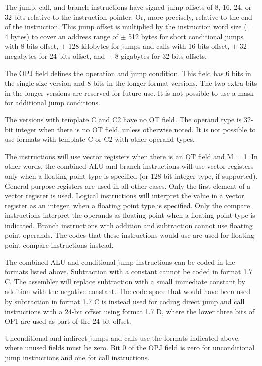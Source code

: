 \documentclass[forwardcom.tex]{subfiles}
\begin{document}
The jump, call, and branch instructions have signed jump offsets of 8, 16, 24, or 32 bits relative to the instruction pointer. Or, more precisely, relative to the end of the instruction. This jump offset is multiplied by the instruction word size (= 4 bytes) to cover an address range of $\pm$ 512 bytes for short conditional jumps with 8 bits offset, $\pm$ 128 kilobytes for jumps and calls with 16 bits offset, $\pm$ 32 megabytes for 24 bits offset, and $\pm$ 8 gigabytes for 32 bits offsets.
\vv

The OPJ field defines the operation and jump condition. This field has 6 bits in the single size version and 8 bits in the longer format versions. The two extra bits in the longer versions are reserved for future use. It is not possible to use a mask for additional jump conditions.
\vv

The versions with template C and C2 have no OT field. The operand type is 32-bit integer when there is no OT field, unless otherwise noted. It is not possible to use formats with template C or C2 with other operand types. 
\vv

The instructions will use vector registers when there is an OT field and M = 1. In other words, the combined ALU-and-branch instructions will use vector registers only when a floating point type is specified (or 128-bit integer type, if supported). General purpose registers are used in all other cases. Only the first element of a vector register is used. 
Logical instructions will interpret the value in a vector register as an integer, when a floating point type is specified. Only the compare instructions interpret the operands as floating point when a floating point type is indicated. Branch instructions with addition and subtraction cannot use floating point operands. The codes that these instructions would use are used for floating point compare instructions instead.
\vv

The combined ALU and conditional jump instructions can be coded in the formats listed above. Subtraction with a constant cannot be coded in format 1.7 C. The assembler will replace subtraction with a small immediate constant by addition with the negative constant. The code space that would have been used by subtraction in format 1.7 C is instead used for coding direct jump and call instructions with a 24-bit offset using format 1.7 D, where the lower three bits of OP1 are used as part of the 24-bit offset.
\vv

Unconditional and indirect jumps and calls use the formats indicated above, where unused fields must be zero. Bit 0 of the OPJ field is zero for unconditional jump instructions and one for call instructions.
\vv
\end{document}
